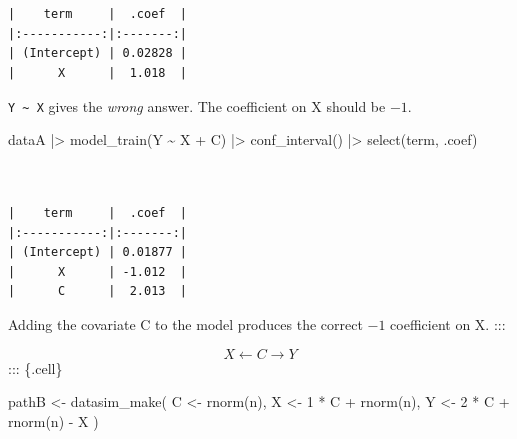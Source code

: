 \documentclass[
  letterpaper,
  DIV=11,
  numbers=noendperiod,
  oneside]{scrartcl}
\newenvironment{Shaded}{\begin{snugshade}}{\end{snugshade}}
\newcommand{\DecValTok}[1]{\textcolor[rgb]{0.68,0.00,0.00}{#1}}
\newcommand{\FunctionTok}[1]{\textcolor[rgb]{0.28,0.35,0.67}{#1}}
\newcommand{\NormalTok}[1]{\textcolor[rgb]{0.00,0.23,0.31}{#1}}
\newcommand{\OtherTok}[1]{\textcolor[rgb]{0.00,0.23,0.31}{#1}}
\newcommand{\SpecialCharTok}[1]{\textcolor[rgb]{0.37,0.37,0.37}{#1}}
\newcommand*\circled[1]{\tikz[baseline=(char.base)]{
          \node[shape=circle,draw,inner sep=1pt] (char) {{\scriptsize#1}};}}
\begin{document}
\begin{verbatim}


|    term     |  .coef  |
|:-----------:|:-------:|
| (Intercept) | 0.02828 |
|      X      |  1.018  |
\end{verbatim}

\texttt{Y\ \textasciitilde{}\ X} gives the \emph{wrong} answer. The
coefficient on X should be \(-1\).

\begin{Shaded}
\begin{Highlighting}[]
\NormalTok{dataA }\SpecialCharTok{|\textgreater{}} \FunctionTok{model\_train}\NormalTok{(Y }\SpecialCharTok{\textasciitilde{}}\NormalTok{ X }\SpecialCharTok{+}\NormalTok{ C) }\SpecialCharTok{|\textgreater{}} 
  \FunctionTok{conf\_interval}\NormalTok{() }\SpecialCharTok{|\textgreater{}}
  \FunctionTok{select}\NormalTok{(term, .coef)}
\end{Highlighting}
\end{Shaded}

\begin{verbatim}


|    term     |  .coef  |
|:-----------:|:-------:|
| (Intercept) | 0.01877 |
|      X      | -1.012  |
|      C      |  2.013  |
\end{verbatim}

Adding the covariate C to the model produces the correct \(-1\)
coefficient on X. :::

\begin{tcolorbox}[enhanced jigsaw, colbacktitle=quarto-callout-note-color!10!white, opacityback=0, breakable, opacitybacktitle=0.6, colback=white, coltitle=black, arc=.35mm, title=\textcolor{quarto-callout-note-color}{\faInfo}\hspace{0.5em}{Experiment B. \textbf{Common cause} backdoor pathway}, left=2mm, colframe=quarto-callout-note-color-frame, rightrule=.15mm, bottomrule=.15mm, leftrule=.75mm, bottomtitle=1mm, toptitle=1mm, titlerule=0mm, toprule=.15mm]

\[X \leftarrow C \rightarrow Y\] ::: \{.cell\}

\begin{Shaded}
\begin{Highlighting}[]
\NormalTok{pathB }\OtherTok{\textless{}{-}} \FunctionTok{datasim\_make}\NormalTok{(}
\NormalTok{  C }\OtherTok{\textless{}{-}} \FunctionTok{rnorm}\NormalTok{(n),}
\NormalTok{  X }\OtherTok{\textless{}{-}} \DecValTok{1} \SpecialCharTok{*}\NormalTok{ C }\SpecialCharTok{+} \FunctionTok{rnorm}\NormalTok{(n),}
\NormalTok{  Y }\OtherTok{\textless{}{-}} \DecValTok{2} \SpecialCharTok{*}\NormalTok{ C }\SpecialCharTok{+} \FunctionTok{rnorm}\NormalTok{(n) }\SpecialCharTok{{-}}\NormalTok{ X}\hspace*{\fill}\NormalTok{\circled{1}}
\NormalTok{)}
\end{Highlighting}
\end{Shaded}

\end{tcolorbox}
\end{document}
